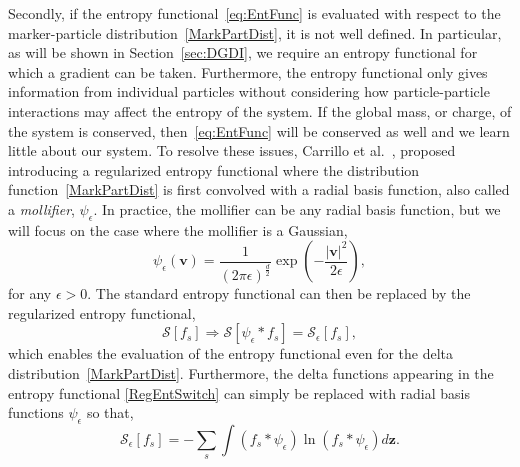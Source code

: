 \documentclass[preprint,12pt]{elsarticle}
\theoremstyle{definition}
\begin{document}
Secondly, if the entropy functional~\eqref{eq:EntFunc} is evaluated with respect to the marker-particle distribution~\eqref{MarkPartDist}, it is not well defined. In particular, as will be shown in Section~\ref{sec:DGDI}, we require an entropy functional for which a gradient can be taken. Furthermore, the entropy functional only gives information from individual particles without considering how particle-particle interactions may affect the entropy of the system. If the global mass, or charge, of the system is conserved, then~\eqref{eq:EntFunc} will be conserved as well and we learn little about our system. To resolve these issues, Carrillo et al.~\cite{Carrillo2020}, proposed introducing a regularized entropy functional where the distribution function~\eqref{MarkPartDist} is first convolved with a radial basis function, also called a \textit{mollifier}, $\psi_{\epsilon}$. In practice, the mollifier can be any radial basis function, but we will focus on the case where the mollifier is a Gaussian, 
\begin{equation}
\psi_{\epsilon}(\boldsymbol{v})=\frac{1}{(2 \pi \epsilon)^{\frac{d}{2}}} \exp \left(-\frac{|\boldsymbol{v}|^{2}}{2 \epsilon}\right),
\end{equation}
for any $\epsilon > 0$. The standard entropy functional can then be replaced by the regularized entropy functional,
\begin{equation}
\mathcal{S} \left[ f_s \right] \Rightarrow \mathcal{S} \left[ \psi_{\epsilon} * f_s \right] = \mathcal{S}_\epsilon \left[ f_s \right], 
\label{RegEntSwitch}
\end{equation}
which enables the evaluation of the entropy functional even for the delta distribution~\eqref{MarkPartDist}. Furthermore, the delta functions appearing in the entropy functional \eqref{RegEntSwitch} can simply be replaced with radial basis functions $\psi_{\epsilon}$ so that,
\begin{equation}
\mathcal{S}_\epsilon \left[ f_s \right]=-\sum_s \int \left(f_s \ast \psi_{\epsilon}\right) \ln \left( f_s \ast \psi_{\epsilon} \right) d\boldsymbol{z}.
\label{RegEntropy}
\end{equation}

\end{document}
